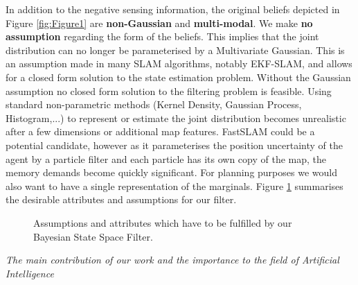 In addition to the negative sensing information, the original beliefs depicted in Figure \ref{fig:Figure1} are \textbf{non-Gaussian}
and \textbf{multi-modal}. We make \textbf{no assumption} regarding the form of the beliefs. This implies that the joint distribution 
can no longer be parameterised by a Multivariate Gaussian. 
This is an assumption made in many SLAM algorithms, notably EKF-SLAM, and allows for a closed form solution to the state estimation problem. Without the Gaussian assumption 
no closed form solution to the filtering problem is feasible. 
Using standard non-parametric methods (Kernel Density, Gaussian Process, Histogram,...) to represent or estimate the joint distribution becomes
unrealistic after a few dimensions or additional map features. 
FastSLAM could be a potential candidate, however as it parameterises the position uncertainty of the agent by a particle filter and each
particle has its own copy of the map, the memory demands become quickly significant.  For planning purposes we would also want to have a 
single representation of the marginals. Figure \ref{fig:ch5_assmuptions} summarises the desirable attributes and assumptions for our filter.

\begin{figure}
\centering
{}%
\caption{Assumptions and attributes which have to be fulfilled by our Bayesian State Space Filter. }
 \label{fig:ch5_assmuptions}
\end{figure}

\textit{The main contribution of our work and the importance to the field of Artificial Intelligence} 

